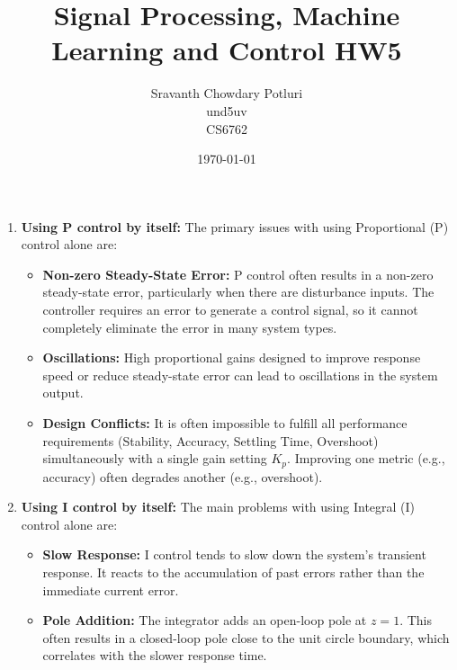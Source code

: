 \documentclass[a4paper,12pt]{article}
\title{Signal Processing, Machine Learning and Control HW5}
\author{Sravanth Chowdary Potluri \\ und5uv \\ CS6762}
\date{\today}
\begin{document}
\maketitle

\section{}

\begin{enumerate}[label=\alph*.]
    \item \textbf{Using P control by itself:}
    The primary issues with using Proportional (P) control alone are:
    \begin{itemize}
        \item \textbf{Non-zero Steady-State Error:} P control often results in a non-zero steady-state error, particularly when there are disturbance inputs. The controller requires an error to generate a control signal, so it cannot completely eliminate the error in many system types.
        \item \textbf{Oscillations:} High proportional gains designed to improve response speed or reduce steady-state error can lead to oscillations in the system output.
        \item \textbf{Design Conflicts:} It is often impossible to fulfill all performance requirements (Stability, Accuracy, Settling Time, Overshoot) simultaneously with a single gain setting $K_p$. Improving one metric (e.g., accuracy) often degrades another (e.g., overshoot).
    \end{itemize}

    \item \textbf{Using I control by itself:}
    The main problems with using Integral (I) control alone are:
    \begin{itemize}
        \item \textbf{Slow Response:} I control tends to slow down the system's transient response. It reacts to the accumulation of past errors rather than the immediate current error.
        \item \textbf{Pole Addition:} The integrator adds an open-loop pole at $z=1$. This often results in a closed-loop pole close to the unit circle boundary, which correlates with the slower response time.
    \end{itemize}


\end{enumerate}
\end{document}
